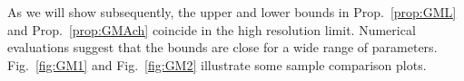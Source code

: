 \documentclass[journal, twocolumn, 10pt]{IEEEtran}
\newtheorem{thm}{Theorem}
\begin{document}



As we will show subsequently, the upper and lower bounds in Prop.~\ref{prop:GML} and Prop.~\ref{prop:GMAch} coincide in the high resolution limit. Numerical evaluations suggest that the bounds are close for a wide range of parameters.  Fig.~\ref{fig:GM1} and Fig.~\ref{fig:GM2} illustrate some sample comparison plots. %
\end{document}
